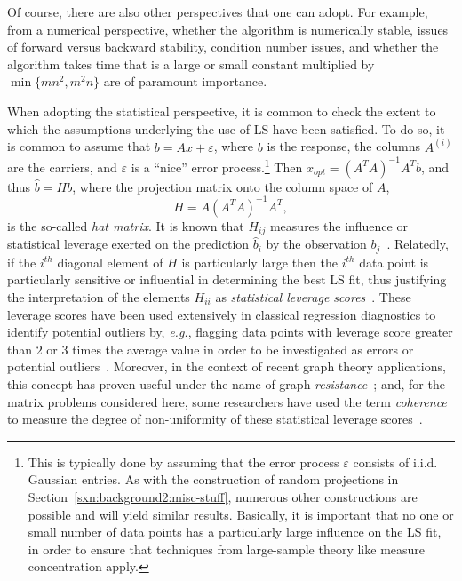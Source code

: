 \documentclass[twoside]{article}
\begin{document}
Of course, there are also other perspectives that one can adopt.
For example, from a numerical perspective, whether the algorithm is 
numerically stable, issues of forward versus backward stability, condition
number issues, and whether the algorithm takes time that is a large or small 
constant multiplied by $\min\{mn^2,m^2n\}$ are of paramount importance.

When adopting the statistical perspective, it is common to check the extent 
to which the assumptions underlying the use of LS have been satisfied.
To do so, it is common to assume that $b=Ax+\varepsilon$, where $b$ is the 
response, the columns $A^{(i)}$ are the carriers, and $\varepsilon$ is a 
``nice'' error process.\footnote{This is typically done by assuming that the error process 
$\varepsilon$ consists of i.i.d. Gaussian entries.  As with the 
construction of random projections in 
Section~\ref{sxn:background2:misc-stuff}, numerous other constructions are 
possible and will yield similar results.  
Basically, it is important that no one or small number of data points has a
particularly large influence on the LS fit, in order to ensure that 
techniques from large-sample theory like measure concentration apply.}
Then $x_{opt}=(A^TA)^{-1}A^Tb$, and thus $\hat{b}=Hb$, where the projection 
matrix onto the column space of $A$, 
$$
H=A(A^TA)^{-1}A^T  ,
$$ is the so-called \emph{hat matrix}.
It is known that $H_{ij}$ measures the influence or statistical leverage 
exerted on the prediction $\hat{b}_i$ by the observation 
$b_j$~\cite{HW78,ChatterjeeHadi88,CH86,VW81,ChatterjeeHadiPrice00}.
Relatedly, if the $i^{th}$ diagonal element of $H$ is particularly large 
then the $i^{th}$ data point is particularly sensitive or influential in 
determining the best LS fit, thus justifying the interpretation of the 
elements $H_{ii}$ as \emph{statistical leverage scores}~\cite{CUR_PNAS}.
These leverage scores have been used extensively in classical 
regression diagnostics to identify potential outliers by, \emph{e.g.}, 
flagging data points with leverage score greater than $2$ or $3$ times the 
average value in order to be investigated as errors or potential 
outliers~\cite{ChatterjeeHadi88}.
Moreover, in the context of recent graph theory applications, this concept 
has proven useful under the name of graph 
\emph{resistance}~\cite{SS08a_STOC}; and, for the matrix problems considered 
here, some researchers have used the term \emph{coherence} to measure the 
degree of non-uniformity of these statistical leverage 
scores~\cite{CR09,TalRos10,MTJ11_TR}.
\end{document}
